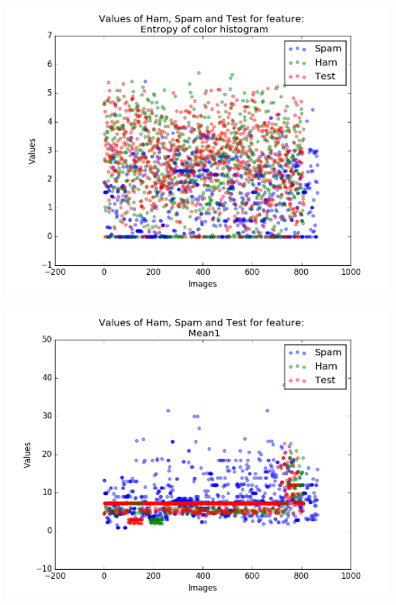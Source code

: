 \begin{figure}[h]
	\centering
	\begin{minipage}{.5\textwidth}
		\centering
		\includegraphics[width=\linewidth]{images/appA/Entropyofcolorhistogram_values_scatter}
		\label{fig:Entropyofcolorhistogram_values_scatter}
	\end{minipage}%
	\begin{minipage}{.5\textwidth}
		\centering
		\includegraphics[width=\linewidth]{images/appA/Mean1_values_scatter}
		\label{fig:Mean1_values_scatter}
	\end{minipage}
\end{figure}


